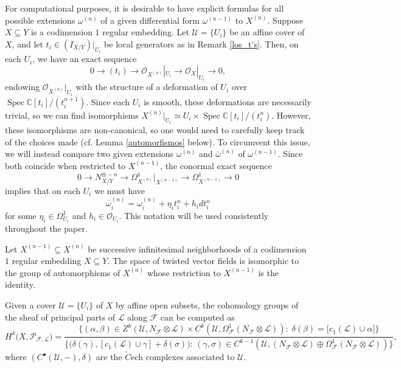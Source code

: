 \documentclass[10pt,a4paper]{amsart}
\DeclareMathOperator{\Spec}{Spec}
\newcommand\C{\mathbb{C}}
\newcommand{\F}{\mathscr{F}}
\newcommand{\OO}{\mathcal{O}}
\newcommand{\PP}{\mathcal{P}}
\newcommand{\U}{\mathcal{U}}
\renewcommand{\L}{\mathcal{L}}
\begin{document}
\begin{remark} \label{notacion:formasdif}
For computational purposes, it is desirable to have explicit formulas for all possible extensions $\omega^{(n)}$ of a given differential form $\omega^{(n-1)}$ to $X^{(n)}$. Suppose $X\subseteq Y$ is a codimension $1$ regular embedding. Let $\mathcal{U} = \{ U_i \}$ be an affine cover of $X$, and let $t_i \in (I_{X/Y})|_{U_i}$ be local generators as in Remark \ref{los_t's}. Then, on each $U_i$, we have an exact sequence
\[ 0\rightarrow (t_i)\rightarrow \OO_{X^{(n)}}|_{U_i}\rightarrow \OO_X|_{U_i}\rightarrow 0, \]
endowing $\OO_{X^{(n)}}|_{U_i}$ with the structure of a deformation of $U_i$ over $\Spec \mathbb{C}[t_i]/(t_i^{n+1})$. Since each $U_i$ is smooth, these deformations are necessarily trivial, so we can find isomorphisms $X^{(n)}|_{U_i} \simeq U_i\times \Spec \C[t_i]/(t_i^n)$.
However, these isomorphisms are non-canonical, so one would need to carefully keep track of the choices made (cf. Lemma \ref{automorfismos} below). To circumvent this issue, we will instead compare two given extensions $\omega^{(n)}$ and $\overline{\omega}^{(n)}$ of $\omega^{(n-1)}$. Since both coincide when restricted to $X^{(n-1)}$, the conormal exact sequence
\[
0\rightarrow N_{X/Y}^{\otimes - n} \rightarrow \Omega^1_{X^{(n)}}\big|_{X^{(n-1)}}\rightarrow \Omega^1_{X^{(n-1)}}\rightarrow 0
\]
implies that on each $U_i$ we must have 
\begin{equation}
\overline{\omega}^{(n)}_i = \omega^{(n)}_i + \eta_i t_i^n + h_i dt_i^n    
\end{equation}
for some $\eta_i\in \Omega^1_{U_i}$ and $h_i\in \OO_{U_i}$. This notation will be used consistently throughout the paper.
\end{remark}

\begin{lemma} \label{automorfismos}
Let $X^{(n-1)}\subseteq X^{(n)}$ be successive infinitesimal neighborhoods of a codimension $1$ regular embedding $X\subseteq Y$. The space of twisted vector fields 
is isomorphic to the group of automorphisms of $X^{(n)}$ whose restriction to $X^{(n-1)}$ is the identity. 
\end{lemma}

\begin{lemma}\label{cohomology_principal_parts}
Given a cover $\U=\{U_i\}$ of $X$ by affine open subsets, the cohomology groups of the sheaf of principal parts of $\L$ along $\F$ can be computed as
{\smaller\[
H^{k}\big(X,\PP_{\F,\L}\big) = \frac{\big\{(\alpha,\beta)\in Z^k(\U,N_\F\otimes \L)\times C^{k}(\U,\Omega^1_\F(N_\F\otimes \L)):\; \delta(\beta) = \big[c_1(\L)\cup\alpha\big]  \big\}}{\big\{\big(\delta(\gamma),[c_1(\L)\cup\gamma]+\delta(\sigma)\big):\,(\gamma,\sigma)\in C^{k-1}(\U,(N_\F\otimes \L)\oplus\Omega^1_\F(N_\F\otimes \L))\big\}},
\]}
where $(C^\bullet(\U,-),\delta)$ are the $\check{C}$ech complexes associated to $\U$.
\end{lemma}
\end{document}
